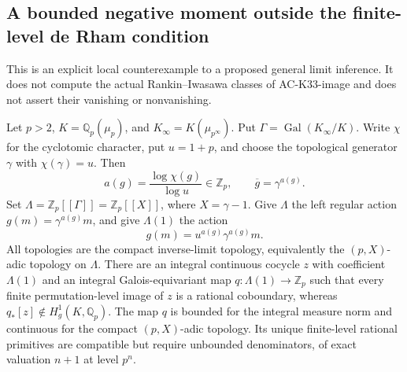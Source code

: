 \subsection{A bounded negative moment outside the finite-level de Rham condition}
\label{sec:cubic-inverse-period-limit}

This is an explicit local counterexample to a proposed general limit
inference.  It does not compute the actual Rankin--Iwasawa classes of
AC-K33-image and does not assert their vanishing or nonvanishing.

\begin{proposition}
\label{AC-K34}
Let \(p>2\), \(K=\mathbb Q_p(\mu_p)\), and
\(K_\infty=K(\mu_{p^\infty})\).  Put
\(\Gamma=\operatorname{Gal}(K_\infty/K)\).
Write \(\chi\) for the cyclotomic character, put \(u=1+p\),
and choose the topological generator \(\gamma\) with
\(\chi(\gamma)=u\).  Then
\[
 a(g)=\frac{\log\chi(g)}{\log u}\in\mathbb Z_p,\qquad
 \overline g=\gamma^{a(g)}.
\]
Set \(\Lambda=\mathbb Z_p[[\Gamma]]=\mathbb Z_p[[X]]\),
where \(X=\gamma-1\).  Give \(\Lambda\) the left regular action
\(g(m)=\gamma^{a(g)}m\), and give \(\Lambda(1)\) the action
\[
 g(m)=u^{a(g)}\gamma^{a(g)}m .
\]
All topologies are the compact inverse-limit topology, equivalently
the \((p,X)\)-adic topology on \(\Lambda\).
There are an integral continuous cocycle \(z\) with coefficient
\(\Lambda(1)\) and an integral Galois-equivariant map
\(q:\Lambda(1)\to\mathbb Z_p\) such that every finite
permutation-level image of \(z\) is a rational coboundary, whereas
\(q_*[z]\notin H_g^1(K,\mathbb Q_p)\).
The map \(q\) is bounded for the integral measure norm and continuous
for the compact \((p,X)\)-adic topology.
Its unique finite-level rational primitives are compatible but require
unbounded denominators, of exact valuation \(n+1\) at level \(p^n\).
\end{proposition}

